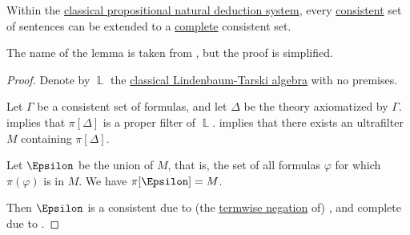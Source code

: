 \begin{lemma}\label{thm:extension_to_complete_consistent_set}
  Within the \hyperref[def:abstract_natural_deduction_system]{classical propositional natural deduction system}, every \hyperref[def:consistent_set_of_sentences]{consistent} set of sentences can be extended to a \hyperref[def:complete_set_of_sentences]{complete} consistent set.
\end{lemma}
\begin{comments}
  \item The name of the lemma is taken from , but the proof is simplified.
\end{comments}
\begin{proof}
  Denote by \( \BbbL \) the \hyperref[thm:lindenbaum_tarski_algebras]{classical Lindenbaum-Tarski algebra} with no premises.

  Let \( \Gamma \) be a consistent set of formulas, and let \( \Delta \) be the theory axiomatized by \( \Gamma \).  implies that \( \pi[\Delta] \) is a proper filter of \( \BbbL \).  implies that there exists an ultrafilter \( M \) containing \( \pi[\Delta] \).

  Let \( \Epsilon \) be the union of \( M \), that is, the set of all formulas \( \varphi \) for which \( \pi(\varphi) \) is in \( M \). We have \( \pi[\Epsilon] = M \).

  Then \( \Epsilon \) is a consistent due to (the \hyperref[thm:classical_equivalences/biconditional_member_negation]{termwise negation} of) , and complete due to .
\end{proof}


